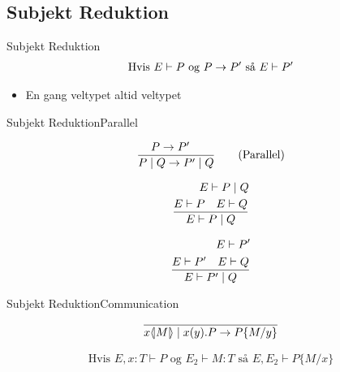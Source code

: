 \subsection{Subjekt Reduktion}
\begin{frame}{Subjekt Reduktion}
\begin{align*}
\text{Hvis } E \vdash P \text{ og } P \rightarrow P' \text{ så } E \vdash P'
\end{align*}
\begin{itemize}
\item En gang veltypet altid veltypet
\end{itemize}
\end{frame}

\begin{frame}{Subjekt Reduktion}{Parallel}

\begin{align*}
\frac{P \rightarrow P' \quad}{P \mid Q \rightarrow P' \mid Q} \tag{Parallel}\\
\end{align*}

\begin{align*}
E \vdash P \mid Q\\
\frac{E \vdash P \quad E \vdash Q}{E \vdash P \mid Q}\\
\end{align*}

\begin{align*}
E \vdash P'\\
\frac{E \vdash P' \quad E \vdash Q}{E \vdash P' \mid Q}
\end{align*}

\end{frame}

\begin{frame}{Subjekt Reduktion}{Communication}
\begin{align*}
\frac{}{x \langle \! | M | \! \rangle \mid x(y).P \rightarrow P\{M/y\}}
\end{align*}

\begin{align*}
\tag{Lemma substitution} \text{Hvis } E,x:T \vdash P \text{ og } E_2 \vdash M:T \text{ så } E,E_2\vdash P\{M/x\}
\end{align*}

\end{frame}

